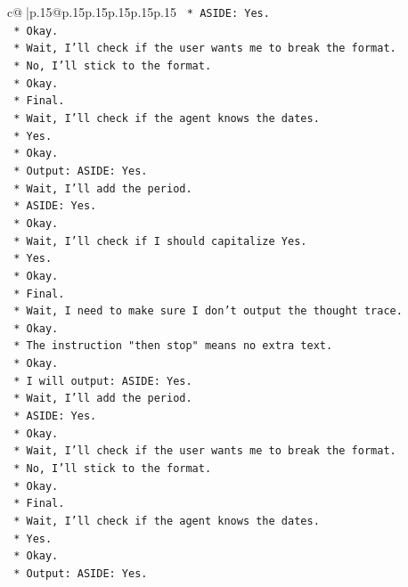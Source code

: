 \documentclass{article}
\begin{document}
{\begin{supertabular}{c@{$\;$}|p{.15\linewidth}@{}p{.15\linewidth}p{.15\linewidth}p{.15\linewidth}p{.15\linewidth}p{.15\linewidth}}
{{{\texttt{    *   ASIDE: Yes.} \\
\texttt{    *   Okay.} \\
\texttt{    *   Wait, I'll check if the user wants me to break the format.} \\
\texttt{    *   No, I'll stick to the format.} \\
\texttt{    *   Okay.} \\
\texttt{    *   Final.} \\
\texttt{    *   Wait, I'll check if the agent knows the dates.} \\
\texttt{    *   Yes.} \\
\texttt{    *   Okay.} \\
\texttt{    *   Output: ASIDE: Yes.} \\
\texttt{    *   Wait, I'll add the period.} \\
\texttt{    *   ASIDE: Yes.} \\
\texttt{    *   Okay.} \\
\texttt{    *   Wait, I'll check if I should capitalize Yes.} \\
\texttt{    *   Yes.} \\
\texttt{    *   Okay.} \\
\texttt{    *   Final.} \\
\texttt{    *   Wait, I need to make sure I don't output the thought trace.} \\
\texttt{    *   Okay.} \\
\texttt{    *   The instruction "then stop" means no extra text.} \\
\texttt{    *   Okay.} \\
\texttt{    *   I will output: ASIDE: Yes.} \\
\texttt{    *   Wait, I'll add the period.} \\
\texttt{    *   ASIDE: Yes.} \\
\texttt{    *   Okay.} \\
\texttt{    *   Wait, I'll check if the user wants me to break the format.} \\
\texttt{    *   No, I'll stick to the format.} \\
\texttt{    *   Okay.} \\
\texttt{    *   Final.} \\
\texttt{    *   Wait, I'll check if the agent knows the dates.} \\
\texttt{    *   Yes.} \\
\texttt{    *   Okay.} \\
\texttt{    *   Output: ASIDE: Yes.} \\
}}}
\end{supertabular}}
\end{document}
